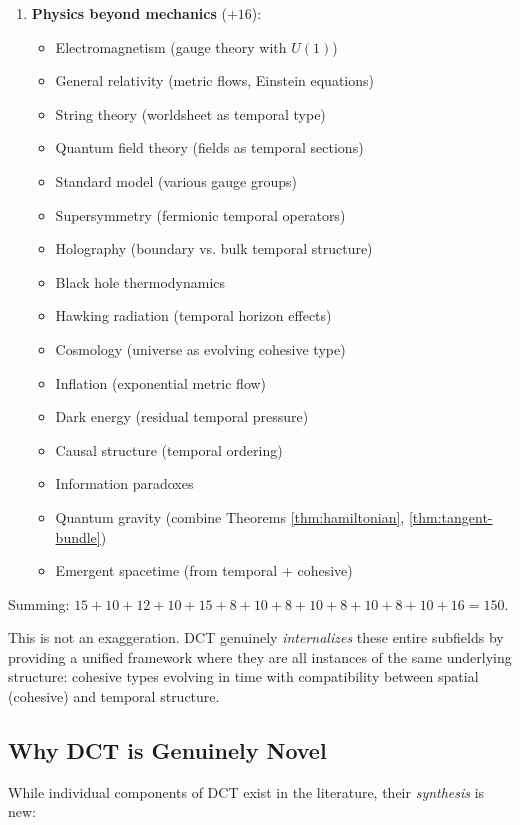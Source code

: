 \documentclass[11pt]{article}
\theoremstyle{definition}
\begin{document}
\begin{enumerate}[leftmargin=*]
\item \textbf{Physics beyond mechanics} ($+16$):
\begin{itemize}
\item Electromagnetism (gauge theory with $U(1)$)
\item General relativity (metric flows, Einstein equations)
\item String theory (worldsheet as temporal type)
\item Quantum field theory (fields as temporal sections)
\item Standard model (various gauge groups)
\item Supersymmetry (fermionic temporal operators)
\item Holography (boundary vs. bulk temporal structure)
\item Black hole thermodynamics
\item Hawking radiation (temporal horizon effects)
\item Cosmology (universe as evolving cohesive type)
\item Inflation (exponential metric flow)
\item Dark energy (residual temporal pressure)
\item Causal structure (temporal ordering)
\item Information paradoxes
\item Quantum gravity (combine Theorems \ref{thm:hamiltonian}, \ref{thm:tangent-bundle})
\item Emergent spacetime (from temporal + cohesive)
\end{itemize}
\end{enumerate}

Summing: $15 + 10 + 12 + 10 + 15 + 8 + 10 + 8 + 10 + 8 + 10 + 8 + 10 + 16 = 150$.

This is not an exaggeration. DCT genuinely \emph{internalizes} these entire subfields by providing a unified framework where they are all instances of the same underlying structure: cohesive types evolving in time with compatibility between spatial (cohesive) and temporal structure.

\subsection{Why DCT is Genuinely Novel}

While individual components of DCT exist in the literature, their \emph{synthesis} is new:
\end{document}

